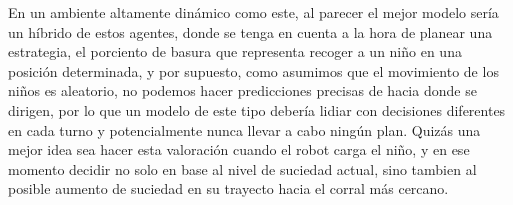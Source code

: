 \documentclass[a4paper, 12pt]{article}
\begin{document}
En un ambiente altamente din\'amico como este, al parecer el mejor modelo ser\'ia un h\'ibrido
de estos agentes, donde se tenga en cuenta a la hora de planear una estrategia, el porciento de basura
que representa recoger a un niño en una posici\'on determinada, y por supuesto, como asumimos que el movimiento
de los niños es aleatorio, no podemos hacer predicciones precisas de hacia donde se dirigen, por lo que un modelo
de este tipo deber\'ia lidiar con decisiones diferentes en cada turno y potencialmente nunca llevar a cabo ning\'un plan.
Quiz\'as una mejor idea sea hacer esta valoraci\'on cuando el robot carga el niño, y en ese momento decidir no solo en base
al nivel de suciedad actual, sino tambien al posible aumento de suciedad en su trayecto hacia el corral m\'as cercano.
\end{document}
